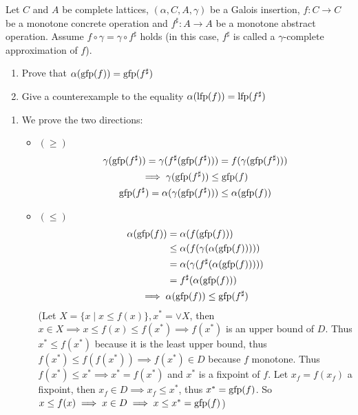 \begin{exercise}{
    Let $C$ and $A$ be complete lattices, $(\alpha, C, A, \gamma)$ be a Galois insertion, $f: C \to C$ be a monotone concrete operation and $f^\sharp: A \to A$ be a monotone abstract operation. Assume $f \circ \gamma = \gamma \circ f^\sharp$ holds (in this case, $f^\sharp$ is called a $\gamma$-complete approximation of $f$).
    \begin{enumerate}[1.]
        \item Prove that $\alpha(\operatorname{gfp}(f)) = \operatorname{gfp}(f^\sharp)$
        \item Give a counterexample to the equality $\alpha(\operatorname{lfp}(f)) = \operatorname{lfp}(f^\sharp)$
    \end{enumerate}
}
    \begin{enumerate}[1.]
        \item We prove the two directions:
        \begin{itemize}
            \item $(\geq)$
            \begin{gather*}
                \gamma(\operatorname{gfp}(f^\sharp)) = \gamma(f^\sharp (\operatorname{gfp}(f^\sharp))) = f(\gamma(\operatorname{gfp}(f^\sharp))) \\
                \implies \gamma(\operatorname{gfp}(f^\sharp)) \leq \operatorname{gfp}(f) \\
                \operatorname{gfp}(f^\sharp) = \alpha(\gamma(\operatorname{gfp}(f^\sharp))) \leq \alpha(\operatorname{gfp}(f))
            \end{gather*}
            \item $(\leq)$
            \begin{gather*}
                \begin{aligned}
                    \alpha(\operatorname{gfp}(f)) &= \alpha(f(\operatorname{gfp}(f))) \\
                    &\leq \alpha(f(\gamma(\alpha(\operatorname{gfp}(f))))) \\
                    &= \alpha(\gamma(f^\sharp(\alpha(\operatorname{gfp}(f))))) \\
                    &= f^\sharp(\alpha(\operatorname{gfp}(f)))
                \end{aligned} \\
                \implies \alpha(\operatorname{gfp}(f)) \leq \operatorname{gfp}(f^\sharp)
            \end{gather*}
            (Let $X = \{x \mid x \leq f(x) \}, x^* = \vee X$, then $x \in X \implies x \leq f(x) \leq f(x^*) \implies f(x^*)$ is an upper bound of $D$. Thus $x^* \leq f(x^*)$ because it is the least upper bound, thus $f(x^*) \leq f(f(x^*)) \implies f(x^*) \in D$ because $f$ monotone. Thus $f(x^*) \leq x^* \implies x^* = f(x^*)$ and $x^*$ is a fixpoint of $f$. Let $x_f = f(x_f)$ a fixpoint, then $x_f \in D \implies x_f \leq x^*$, thus $x^* = \operatorname{gfp}(f)$. So $x \leq f(x) \implies x \in D \implies x \leq x^* = \operatorname{gfp}(f)$)

\end{itemize}
\end{enumerate}
\end{exercise}
